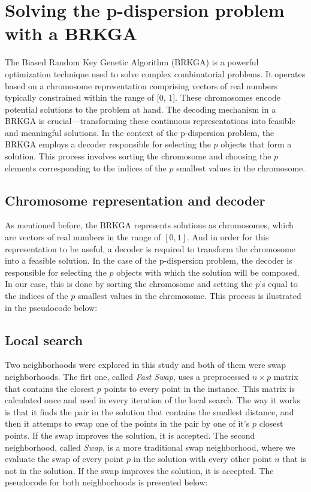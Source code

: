 \documentclass[preprint,12pt]{elsarticle}
\begin{document}
\section{Solving the p-dispersion problem with a BRKGA}
\label{sec:brkga}
The Biased Random Key Genetic Algorithm (BRKGA) is a powerful optimization technique used to solve complex combinatorial problems. It operates based on a chromosome representation comprising vectors of real numbers typically constrained within the range of [0, 1]. These chromosomes encode potential solutions to the problem at hand. The decoding mechanism in a BRKGA is crucial—transforming these continuous representations into feasible and meaningful solutions. In the context of the p-dispersion problem, the BRKGA employs a decoder responsible for selecting the $p$ objects that form a solution. This process involves sorting the chromosome and choosing the $p$ elements corresponding to the indices of the $p$ smallest values in the chromosome.

\subsection{Chromosome representation and decoder}
As mentioned before, the BRKGA represents solutions as chromosomes, which are vectors of real numbers in the range of $[0,1]$. And in order for this representation to be useful, a decoder is required to transform the chromosome into a feasible solution. In the case of the p-dispersion problem, the decoder is responsible for selecting the $p$ objects with which the solution will be composed. In our case, this is done by sorting the chromosome and setting the $p$'s equal to the indices of the $p$ smallest values in the chromosome.
This process is ilustrated in the pseudocode below: 
\subsection{Local search}
Two neighborhoods were explored in this study and both of them were swap neighborhoods. The firt one, called \textit{Fast Swap}, uses a preprocessed $n\times p$ matrix that contains the closest $p$ points to every point in the instance. This matrix is calculated once and used in every iteration of the local search. The way it works is that it finds the pair in the solution that contains the smallest distance, and then it attemps to swap one of the points in the pair by one of it's $p$ closest points. If the swap improves the solution, it is accepted.
The second neighborhood, called \textit{Swap}, is a more traditional swap neighborhood, where we evaluate the swap of every point $p$ in the solution with every other point $n$ that is not in the solution. If the swap improves the solution, it is accepted.
The pseudocode for both neighborhoods is presented below:
\end{document}
